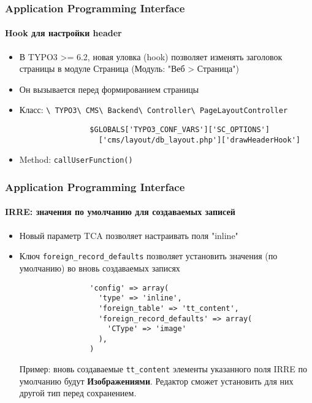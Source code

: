 \begin{frame}[fragile]
	\frametitle{Application Programming Interface}
	\framesubtitle{Hook для настройки header}

	\begin{itemize}
		\item В TYPO3 >= 6.2, новая уловка (hook) позволяет изменять заголовок страницы в модуле Страница (Модуль: "Веб > Страница")
		\item Он вызывается перед формированием страницы
		\item Класс:\newline
			\smaller
				\texttt{\textbackslash
					TYPO3\textbackslash
					CMS\textbackslash
					Backend\textbackslash
					Controller\textbackslash
					PageLayoutController}\normalsize

			\lstset{
				basicstyle=\smaller\ttfamily
			}

			\begin{lstlisting}
				$GLOBALS['TYPO3_CONF_VARS']['SC_OPTIONS']
				  ['cms/layout/db_layout.php']['drawHeaderHook']
			\end{lstlisting}

		\item Method:\newline
			\smaller
				\texttt{callUserFunction()}

	\end{itemize}

\end{frame}


\begin{frame}[fragile]
	\frametitle{Application Programming Interface}
	\framesubtitle{IRRE: значения по умолчанию для создаваемых записей}

	\begin{itemize}
		\item Новый параметр TCA позволяет настраивать поля "inline"
		\item Ключ \texttt{foreign\_record\_defaults} позволяет установить значения (по умолчанию) во вновь создаваемых записях

			\begin{lstlisting}
				'config' => array(
				  'type' => 'inline',
				  'foreign_table' => 'tt_content',
				  'foreign_record_defaults' => array(
				    'CType' => 'image'
				  ),
				)
			\end{lstlisting}

			\small
				Пример: вновь создаваемые \texttt{tt\_content} элементы указанного поля IRRE по умолчанию будут \textbf{Изображениями}. Редактор сможет установить для них другой тип перед сохранением.
			\normalsize
	\end{itemize}

\end{frame}

